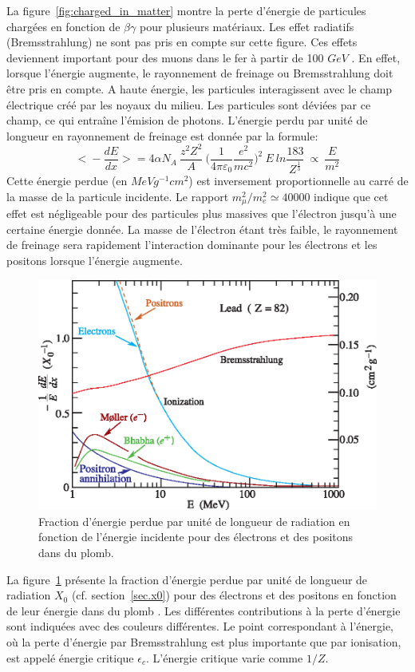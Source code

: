 La figure~\ref{fig:charged_in_matter} montre la perte d'énergie de particules chargées en fonction de $\beta\gamma$ pour plusieurs matériaux. Les effet radiatifs (Bremsstrahlung) ne sont pas pris en compte sur cette figure. Ces effets deviennent important pour des muons dans le fer à partir de 100 $GeV$ \cite{pdg}. En effet, lorsque l'énergie augmente, le rayonnement de freinage ou Bremsstrahlung doit être pris en compte. A haute énergie, les particules interagissent avec le champ électrique créé par les noyaux du milieu. Les particules sont déviées par ce champ, ce qui entraîne l'émision de photons. L'énergie perdu par unité de longueur en rayonnement de freinage est donnée par la formule:
\begin{equation}
  \big<-\frac{dE}{dx}\big>=4\alpha N_A~\frac{z^2Z^2}{A}~\big(\frac{1}{4\pi\varepsilon_0}\frac{e^2}{mc^2}\big)^2~E~ln\frac{183}{Z^{\frac{1}{3}}}~\propto~\frac{E}{m^2}
\end{equation}
Cette énergie perdue (en $MeV g^{-1} cm^2$) est inversement proportionnelle au carré de la masse de la particule incidente. Le rapport $m_{\mu}^2/m_e^2\simeq40000$ indique que cet effet est négligeable pour des particules plus massives que l'électron jusqu'à une certaine énergie donnée. La masse de l'électron étant très faible, le rayonnement de freinage sera rapidement l'interaction dominante pour les électrons et les positons lorsque l'énergie augmente. 
\begin{figure}[!h]
  \begin{center}
    \includegraphics[width=.6\textwidth]{ShowerTh/figs/elossfrac_06.eps}
    \caption{Fraction d'énergie perdue par unité de longueur de radiation en fonction de l'énergie incidente pour des électrons et des positons dans du plomb. }
    \label{fig:electron_in_lead}
  \end{center}
\end{figure}
 La figure~\ref{fig:electron_in_lead} présente la fraction d'énergie perdue par unité de longueur de radiation $X_0$ (cf. section~\ref{sec.x0}) pour des électrons et des positons en fonction de leur énergie dans du plomb \cite{pdg}. Les différentes contributions à la perte d'énergie sont indiquées avec des couleurs différentes. Le point correspondant à l'énergie, où la perte d'énergie par Bremsstrahlung est plus importante que par ionisation, est appelé énergie critique $\epsilon_c$. L'énergie critique varie comme $1/Z$.

